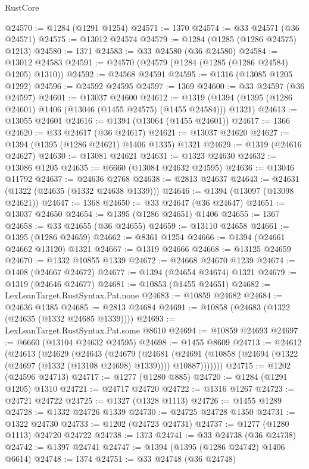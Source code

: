 \begin{lexlean}{RustCore}
\begin{coremodule}
@24570 := @1284 (@1291 @1254)
@24571 := 1370
@24574 := @33 @24571 (@36 @24571)
@24575 := @13012 @24574
@24579 := @1284 (@1285 (@1286 @24575) @1213)
@24580 := 1371
@24583 := @33 @24580 (@36 @24580)
@24584 := @13012 @24583
@24591 := @24570 (@24579 (@1284 (@1285 (@1286 @24584) @1205) @1310))
@24592 := @24568 @24591
@24595 := @1316 (@13085 @1205 @1292)
@24596 := @24592 @24595
@24597 := 1369
@24600 := @33 @24597 (@36 @24597)
@24601 := @13037 @24600
@24612 := @1319 (@1394 (@1395 (@1286 @24601) @1406 (@13046 (@1455 @24575) (@1455 @24584))) @1321)
@24613 := @13055 @24601
@24616 := @1394 (@13064 (@1455 @24601))
@24617 := 1366
@24620 := @33 @24617 (@36 @24617)
@24621 := @13037 @24620
@24627 := @1394 (@1395 (@1286 @24621) @1406 @1335) @1321
@24629 := @1319 (@24616 @24627)
@24630 := @13081 @24621
@24631 := @1323 @24630
@24632 := @13086 @1205
@24635 := @6660 (@13084 @24632 @24595)
@24636 := @13046 @11792
@24637 := @24636 @2768
@24638 := @2813 @24637
@24643 := @24631 (@1322 (@24635 (@1332 @24638 @1339)))
@24646 := @1394 (@13097 (@13098 @24621))
@24647 := 1368
@24650 := @33 @24647 (@36 @24647)
@24651 := @13037 @24650
@24654 := @1395 (@1286 @24651) @1406
@24655 := 1367
@24658 := @33 @24655 (@36 @24655)
@24659 := @13110 @24658
@24661 := @1395 (@1286 @24659)
@24662 := @8361 @1254
@24666 := @1394 (@24661 @24662 @13120) @1321
@24667 := @1319 @24666
@24668 := @13125 @24659
@24670 := @1332 @10855 @1339
@24672 := @24668 @24670 @1239
@24674 := @1408 (@24667 @24672)
@24677 := @1394 (@24654 @24674) @1321
@24679 := @1319 (@24646 @24677)
@24681 := @10853 (@1455 @24651)
@24682 := LexLeanTarget.RustSyntax.Pat.none
@24683 := @10859 @24682
@24684 := @24636 @1385
@24685 := @2813 @24684
@24691 := @10858 (@24683 (@1322 (@24635 (@1332 @24685 @1339))))
@24693 := LexLeanTarget.RustSyntax.Pat.some @8610
@24694 := @10859 @24693
@24697 := @6660 (@13104 @24632 @24595)
@24698 := @1455 @8609
@24713 := @24612
    (@24613
      (@24629
        (@24643
          (@24679
            (@24681
              (@24691 (@10858 (@24694 (@1322 (@24697 (@1332 (@13108 @24698) @1339)))) @10887)))))))
@24715 := @1202 (@24596 @24713)
@24717 := @1277 (@1280 @885)
@24720 := @1284 (@1291 @1205) @1310
@24721 := @24717 @24720
@24722 := @1316 @1267
@24723 := @24721 @24722
@24725 := @1327 (@1328 @1113)
@24726 := @1455 @1289
@24728 := @1332 @24726 @1339
@24730 := @24725 @24728 @1350
@24731 := @1322 @24730
@24733 := @1202 (@24723 @24731)
@24737 := @1277 (@1280 @1113) @24720 @24722
@24738 := 1373
@24741 := @33 @24738 (@36 @24738)
@24742 := @1397 @24741
@24747 := @1394 (@1395 (@1286 @24742) @1406 @6614)
@24748 := 1374
@24751 := @33 @24748 (@36 @24748)

\end{coremodule}
\end{lexlean}
